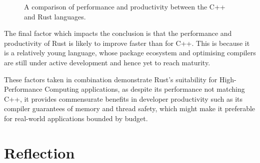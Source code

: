\begin{figure}[H]
    \centering
    
    \caption{A comparison of performance and productivity between the C++ and Rust languages.}
    \label{fig:conclusions_performance_productivity}
\end{figure}


The final factor which impacts the conclusion is that the performance and productivity of Rust is likely to improve faster than for C++. This is because it is a relatively young language, whose package ecosystem and optimising compilers are still under active development and hence yet to reach maturity.

These factors taken in combination demonstrate Rust's suitability for High-Performance Computing applications, as despite its performance not matching C++, it provides commensurate benefits in developer productivity such as its compiler guarantees of memory and thread safety, which might make it preferable for real-world applications bounded by budget.




\section{Reflection}
\label{sec:reflection}


